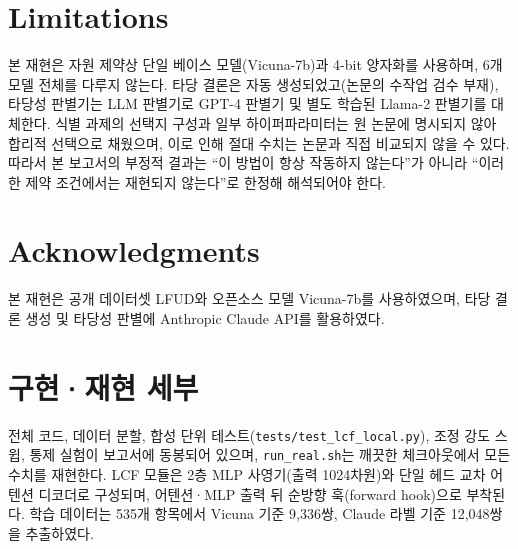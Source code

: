 \documentclass[11pt]{article}
\begin{document}
\section*{Limitations}
본 재현은 자원 제약상 단일 베이스 모델(Vicuna-7b)과 4-bit 양자화를 사용하며, 6개 모델
전체를 다루지 않는다. 타당 결론은 자동 생성되었고(논문의 수작업 검수 부재), 타당성
판별기는 LLM 판별기로 GPT-4 판별기 및 별도 학습된 Llama-2 판별기를 대체한다. 식별 과제의
선택지 구성과 일부 하이퍼파라미터는 원 논문에 명시되지 않아 합리적 선택으로 채웠으며,
이로 인해 절대 수치는 논문과 직접 비교되지 않을 수 있다. 따라서 본 보고서의 부정적 결과는
``이 방법이 항상 작동하지 않는다''가 아니라 ``이러한 제약 조건에서는 재현되지 않는다''로
한정해 해석되어야 한다.

\section*{Acknowledgments}
본 재현은 공개 데이터셋 LFUD와 오픈소스 모델 Vicuna-7b를 사용하였으며, 타당 결론 생성 및
타당성 판별에 Anthropic Claude API를 활용하였다.




\appendix

\section{구현·재현 세부}
\label{sec:appendix}
전체 코드, 데이터 분할, 합성 단위 테스트(\texttt{tests/test\_lcf\_local.py}), 조정 강도
스윕, 통제 실험이 보고서에 동봉되어 있으며, \texttt{run\_real.sh}는 깨끗한 체크아웃에서 모든
수치를 재현한다. LCF 모듈은 2층 MLP 사영기(출력 1024차원)와 단일 헤드 교차 어텐션 디코더로
구성되며, 어텐션·MLP 출력 뒤 순방향 훅(forward hook)으로 부착된다. 학습 데이터는 535개
항목에서 Vicuna 기준 9{,}336쌍, Claude 라벨 기준 12{,}048쌍을 추출하였다.
\end{document}
